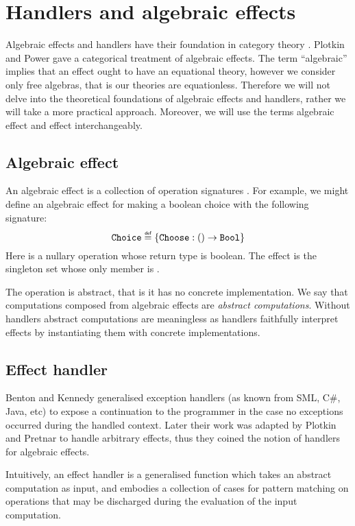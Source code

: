 \section{Handlers and algebraic effects}\label{sec:handlers-and-effects}
Algebraic effects and handlers have their foundation in category theory \cite{Plotkin2001a,Plotkin2013}. Plotkin and Power \cite{Plotkin2001b,Plotkin2001a} gave a categorical treatment of algebraic effects. The term ``algebraic'' implies that an effect ought to have an equational theory, however we consider only free algebras, that is our theories are equationless. Therefore we will not delve into the theoretical foundations of algebraic effects and handlers, rather we will take a more practical approach. Moreover, we will use the terms algebraic effect and effect interchangeably.

\subsection{Algebraic effect}
An algebraic effect is a collection of operation signatures \cite{Lindley2014}. For example, we might define an algebraic effect  for making a boolean choice with the following signature:
\[ \type{Choice} \defas \{ \type{Choose}: () \to \type{Bool} \} \]
Here  is a nullary operation whose return type is boolean. The effect  is the singleton set whose only member is . 

The operation  is abstract, that is it has no concrete implementation. We say that computations composed from algebraic effects are \emph{abstract computations}. Without handlers abstract computations are meaningless as handlers faithfully interpret effects by instantiating them with concrete implementations. 

\subsection{Effect handler}
Benton and Kennedy generalised exception handlers \cite{Benton2001} (as known from SML, C\#, Java, etc) to expose a continuation to the programmer in the case no exceptions occurred during the handled context. Later their work was adapted by Plotkin and Pretnar \cite{Plotkin2013} to handle arbitrary effects, thus they coined the notion of handlers for algebraic effects.

Intuitively, an effect handler is a generalised function which takes an abstract computation as input, and embodies a collection of cases for pattern matching on operations that may be discharged during the evaluation of the input computation.

